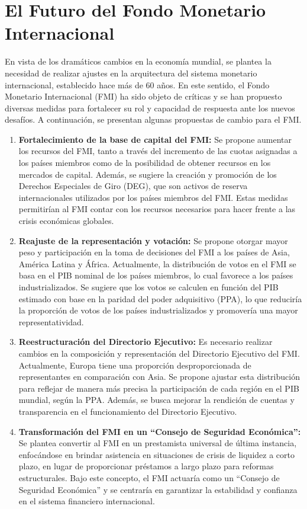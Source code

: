 \documentclass[
  letterpaper,
  DIV=11,
  numbers=noendperiod]{scrartcl}
\begin{document}
\hypertarget{el-futuro-del-fondo-monetario-internacional}{%
\section{El Futuro del Fondo Monetario
Internacional}\label{el-futuro-del-fondo-monetario-internacional}}

En vista de los dramáticos cambios en la economía mundial, se plantea la
necesidad de realizar ajustes en la arquitectura del sistema monetario
internacional, establecido hace más de 60 años. En este sentido, el
Fondo Monetario Internacional (FMI) ha sido objeto de críticas y se han
propuesto diversas medidas para fortalecer su rol y capacidad de
respuesta ante los nuevos desafíos. A continuación, se presentan algunas
propuestas de cambio para el FMI.

\begin{enumerate}
\def\labelenumi{\arabic{enumi}.}
\item
  \textbf{Fortalecimiento de la base de capital del FMI:} Se propone
  aumentar los recursos del FMI, tanto a través del incremento de las
  cuotas asignadas a los países miembros como de la posibilidad de
  obtener recursos en los mercados de capital. Además, se sugiere la
  creación y promoción de los Derechos Especiales de Giro (DEG), que son
  activos de reserva internacionales utilizados por los países miembros
  del FMI. Estas medidas permitirían al FMI contar con los recursos
  necesarios para hacer frente a las crisis económicas globales.
\item
  \textbf{Reajuste de la representación y votación:} Se propone otorgar
  mayor peso y participación en la toma de decisiones del FMI a los
  países de Asia, América Latina y África. Actualmente, la distribución
  de votos en el FMI se basa en el PIB nominal de los países miembros,
  lo cual favorece a los países industrializados. Se sugiere que los
  votos se calculen en función del PIB estimado con base en la paridad
  del poder adquisitivo (PPA), lo que reduciría la proporción de votos
  de los países industrializados y promovería una mayor
  representatividad.
\item
  \textbf{Reestructuración del Directorio Ejecutivo:} Es necesario
  realizar cambios en la composición y representación del Directorio
  Ejecutivo del FMI. Actualmente, Europa tiene una proporción
  desproporcionada de representantes en comparación con Asia. Se propone
  ajustar esta distribución para reflejar de manera más precisa la
  participación de cada región en el PIB mundial, según la PPA. Además,
  se busca mejorar la rendición de cuentas y transparencia en el
  funcionamiento del Directorio Ejecutivo.
\item
  \textbf{Transformación del FMI en un ``Consejo de Seguridad
  Económica'':} Se plantea convertir al FMI en un prestamista universal
  de última instancia, enfocándose en brindar asistencia en situaciones
  de crisis de liquidez a corto plazo, en lugar de proporcionar
  préstamos a largo plazo para reformas estructurales. Bajo este
  concepto, el FMI actuaría como un ``Consejo de Seguridad Económica'' y
  se centraría en garantizar la estabilidad y confianza en el sistema
  financiero internacional.
\end{enumerate}
\end{document}
